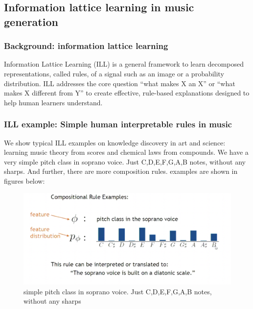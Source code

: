 \documentclass[]{article}
\begin{document}
\subsection{Information lattice learning in music generation}
\subsubsection{Background: information lattice learning}
 Information Lattice Learning (ILL) is a general framework to learn decomposed representations, called rules, of a signal such as an image or a probability distribution. ILL addresses the core question “what makes X an X” or “what makes X different from Y” to create effective, rule-based explanations designed to help human learners understand.\cite{b13} 
\subsubsection{ILL example: Simple human interpretable rules in music}
We show typical ILL examples on knowledge discovery in art and science: learning music theory from scores and chemical laws from compounds. We have a very simple pitch class in soprano voice. Just C,D,E,F,G,A,B notes, without any sharps. And further, there are more composition rules. examples are shown in figures below: 

\begin{figure}[!ht]
\centering
\includegraphics[width=\textwidth]{FIGS/rule1.png}
\caption{simple pitch class in soprano voice. Just C,D,E,F,G,A,B notes, without any sharps}
\label{fig:ai1}
\end{figure}
\end{document}
